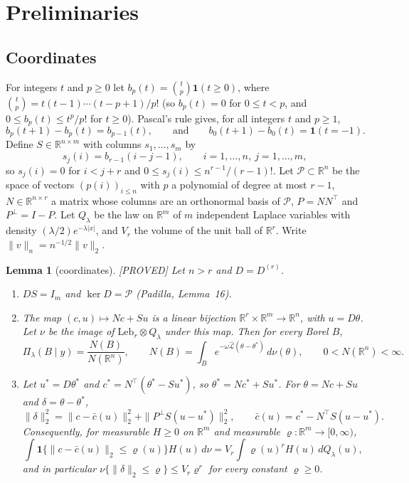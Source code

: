 \documentclass[11pt]{article}
\newtheorem{lemma}{Lemma}
\theoremstyle{definition}
\theoremstyle{remark}
\newcommand{\R}{\mathbb{R}}
\newcommand{\Dr}{D^{(r)}}
\newcommand{\thetas}{\theta^{*}}
\newcommand{\om}{\omega}
\newcommand{\Lh}{\widehat{\mathcal L}}
\newcommand{\Ql}{Q_\lambda}
\newcommand{\Pp}{P^{\perp}}
\newcommand{\cP}{\mathcal P}
\newcommand{\nn}[1]{\|#1\|_n}
\newcommand{\ind}{\mathbf 1}
\newcommand{\proved}{\textup{[PROVED]}}
\begin{document}
\section{Preliminaries}\label{sec:prelim}

\subsection{Coordinates}

For integers $t$ and $p\ge0$ let $b_p(t)=\binom tp\ind(t\ge0)$, where $\binom tp=t(t-1)\cdots(t-p+1)/p!$ (so $b_p(t)=0$ for $0\le t<p$, and $0\le b_p(t)\le t^p/p!$ for $t\ge0$). Pascal's rule gives, for all integers $t$ and $p\ge1$,
\begin{equation}\label{eq:pascal}
b_p(t+1)-b_p(t)=b_{p-1}(t),\qquad\text{and}\qquad b_0(t+1)-b_0(t)=\ind(t=-1).
\end{equation}
Define $S\in\R^{n\times m}$ with columns $s_1,\dots,s_m$ by
\[
s_j(i)=b_{r-1}(i-j-1),\qquad i=1,\dots,n,\ j=1,\dots,m,
\]
so $s_j(i)=0$ for $i<j+r$ and $0\le s_j(i)\le n^{r-1}/(r-1)!$. Let $\cP\subset\R^n$ be the space of vectors $(p(i))_{i\le n}$ with $p$ a polynomial of degree at most $r-1$, $N\in\R^{n\times r}$ a matrix whose columns are an orthonormal basis of $\cP$, $P=NN^\top$ and $\Pp=I-P$. Let $\Ql$ be the law on $\R^m$ of $m$ independent Laplace variables with density $(\lambda/2)e^{-\lambda|x|}$, and $V_r$ the volume of the unit ball of $\R^r$. Write $\nn{v}=n^{-1/2}\|v\|_2$.

\begin{lemma}[coordinates]\label{lem:coord}\proved{}
Let $n>r$ and $D=\Dr$.
\begin{enumerate}[label=(\alph*),itemsep=1pt,topsep=2pt]
\item $DS=I_m$ and $\ker D=\cP$ (Padilla, Lemma~16).
\item The map $(c,u)\mapsto Nc+Su$ is a linear bijection $\R^r\times\R^m\to\R^n$, with $u=D\theta$. Let $\nu$ be the image of $\mathrm{Leb}_r\otimes\Ql$ under this map. Then for every Borel $B$,
\begin{equation}\label{eq:ratio}
\Pi_\lambda(B\mid y)=\frac{N(B)}{N(\R^n)},\qquad N(B)=\int_Be^{-\om\Lh(\theta-\thetas)}\,d\nu(\theta),\qquad 0<N(\R^n)<\infty .
\end{equation}
\item Let $u^{*}=D\thetas$ and $c^{*}=N^\top(\thetas-Su^{*})$, so $\thetas=Nc^{*}+Su^{*}$. For $\theta=Nc+Su$ and $\delta=\theta-\thetas$,
\begin{equation}\label{eq:pyth}
\|\delta\|_2^2=\|c-\bar c(u)\|_2^2+\|\Pp S(u-u^{*})\|_2^2,\qquad \bar c(u)=c^{*}-N^\top S(u-u^{*}).
\end{equation}
Consequently, for measurable $H\ge0$ on $\R^m$ and measurable $\varrho:\R^m\to[0,\infty)$,
\begin{equation}\label{eq:vol}
\int\ind\{\|c-\bar c(u)\|_2\le\varrho(u)\}H(u)\,d\nu=V_r\int\varrho(u)^rH(u)\,d\Ql(u),
\end{equation}
and in particular $\nu\{\|\delta\|_2\le\varrho\}\le V_r\varrho^r$ for every constant $\varrho\ge0$.
\end{enumerate}
\end{lemma}
\end{document}
